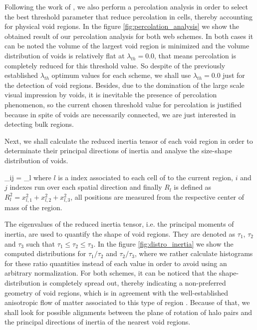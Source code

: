 \documentclass[usenatbib]{latex/mn2e}
\begin{document}
Following the work of , we also perform a 
percolation analysis in order to select the best threshold parameter that
reduce percolation in cells, thereby accounting for physical void regions.
In the figure \ref{fig:percolation_analysis} we show the obtained result 
of our percolation analysis for both web schemes. In both cases it can be 
noted the volume of the largest void region is minimized and the volume 
distribution of voids is relatively flat at $\lambda_{th} = 0.0$, that 
means percolation is completely reduced for this threshold value. So 
despite of the previously established $\lambda_{th}$ optimum values for 
each scheme, we shall use $\lambda_{th} = 0.0$ just for the detection of 
void regions. Besides, due to the domination of the large scale visual 
impression by voids, it is inevitable the presence of percolation 
phenomenon, so the current chosen threshold value for percolation is 
justified because in spite of voids are necessarily connected, we are just 
interested in detecting bulk regions.



Next, we shall calculate the reduced inertia tensor of each void region 
in order to determinate their principal directions of inertia and analyse 
the size-shape distribution of voids.


{ \tau_{ij} = \sum_l  }
where $l$ is a index associated to each cell of to the current region, 
$i$ and $j$ indexes run over each spatial direction and finally 
$R_l$ is defined as $R_l^2 = x_{l,1}^2 + x_{l,2}^2 + x_{l,3}^2$, all 
positions are measured from the respective center of mass of the region.



The eigenvalues of the reduced inertia tensor, i.e. the principal moments
of inertia, are used to quantify the shape of void regions. They are 
denoted as $\tau_1$, $\tau_2$ and $\tau_3$ such that $\tau_1 \leq \tau_2
\leq \tau_3$. In the figure \ref{fig:distro_inertia} we show the computed
distributions for $\tau_1/\tau_2$ and $\tau_2/\tau_3$, where we rather 
calculate histograms for these ratio quantities instead of each value in 
order to avoid using an arbitrary normalization. For both schemes, it can 
be noticed that the shape-distribution is completely spread out, thereby 
indicating a non-preferred geometry of void regions, which is in agreement 
with the well-established anisotropic flow of matter associated to this 
type of region . Because of that, we shall look 
for possible alignments between the plane of rotation of halo pairs and
the principal directions of inertia of the nearest void regions.
\end{document}
